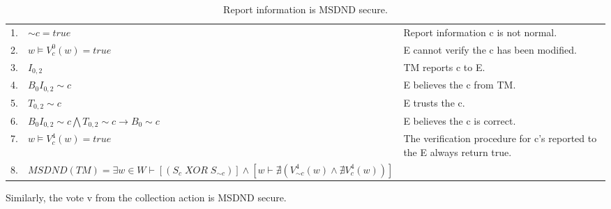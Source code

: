 \documentclass[journal,onecolumn]{IEEEtran}
\begin{document}
\begin{enumerate}
\begin{enumerate}
      \begin{table}[H]
        \caption{Report information is MSDND secure.}
        \centering
        \begin{tabular}{lll}
        1.  & ${\sim} c = true$                                                       & Report information c is not normal.                                                       \\
        2.  & $w \vDash V^0_c(w) = true$                                              & E cannot verify the c has been modified.                                 \\
        3.  & $I_{0,2}$                                                              & TM reports c to E.                                                \\
        4.  & $B_0I_{0,2} {\sim} c$                                                   & E believes the c from TM.                                     \\
        5.  & $T_{0,2} {\sim} c$                                                      & E trusts the c.                                                          \\
        6.  & $B_0I_{0,2} {\sim} c \bigwedge T_{0,2} {\sim} c \rightarrow B_0 {\sim} c$ & E believes the c is correct.                                             \\
        7.  & $w \vDash V^4_c(w) = true$                                                & The verification procedure for c's reported to the E always return true. \\
        8.  & $MSDND (TM) = \exists w \in W \vdash [(S_{c} \; {XOR} \; S_{\sim c})] \wedge [w \vdash \nexists (V_{\sim c}^4 (w) \wedge \nexists V_{c}^4 (w))]$ & 
        \end{tabular}
      \end{table}

      Similarly, the vote v from the collection action is MSDND secure. 


\end{enumerate}
\end{enumerate}
\end{document}
